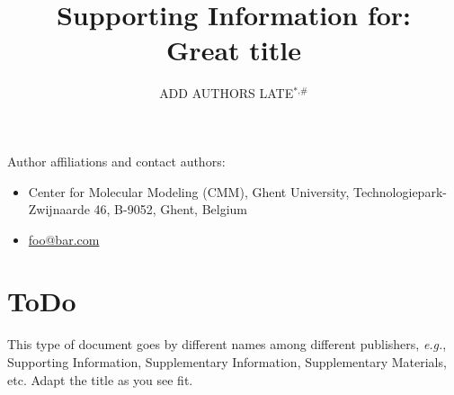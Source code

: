\documentclass[11pt]{article}
\title{{\normalsize Supporting Information for:}\\[0.5em] Great title}
\author{ADD AUTHORS LATE$^\text{*,\#}$}
\date{
    
}
\begin{document}
    \maketitle
    Author affiliations and contact authors:
    \begin{itemize}
        \item[*] Center for Molecular Modeling (CMM), Ghent University, Technologiepark-Zwijnaarde 46, B-9052, Ghent, Belgium
        \item[\#] \href{mailto:foo@bar.com}{foo@bar.com}
    \end{itemize}

    \tableofcontents

    \newpage

    \section{ToDo}
    \label{sec:todo}

    This type of document goes by different names among different publishers,
    \textit{e.g.}, Supporting Information, Supplementary Information, Supplementary Materials, etc.
    Adapt the title as you see fit.
\end{document}
